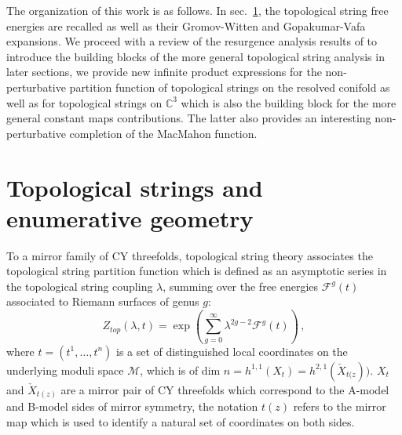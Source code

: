 \documentclass[a4paper,12pt,justification=centering]{article}
\numberwithin{equation}{section}
\theoremstyle{plain}%
\theoremstyle{definition}
\begin{document}
The organization of this work is as follows. In sec.~\ref{sec:freeenergies}, the topological string free energies are recalled as well as their Gromov-Witten and Gopakumar-Vafa expansions. We proceed with a review of the resurgence analysis results of \cite{Alim:2021mhp} to introduce the building blocks of the more general topological string analysis in later sections, we provide new infinite product expressions for the non-perturbative partition function of topological strings on the resolved conifold as well as for topological strings on $\mathbb{C}^3$ which is also the building block for the more general constant maps contributions. The latter also provides an interesting non-perturbative completion of the MacMahon function.





\section{Topological strings and enumerative geometry}\label{sec:freeenergies}
To a mirror family of CY threefolds, topological string theory associates the topological string partition function which is defined as an asymptotic series in the topological string coupling $\lambda$, summing over the free energies $ \mathcal{F}^{g}(t)$ associated to Riemann surfaces of genus $g$:
\begin{equation}
Z_{top} (\lambda,t)= \exp \left(\sum_{g=0}^{\infty} \lambda^{2g-2} \mathcal{F}^{g}(t)\right)\,,
\end{equation}
where $t=(t^1,\dots,t^n)$ is a set of distinguished local coordinates on the underlying moduli space $\mathcal{M}$, which is of dim $n=h^{1,1}(X_t)=h^{2,1}(\check{X}_{t(z}))$. $X_t$ and $\check{X}_{t(z)}$ are a mirror pair of CY threefolds which correspond to the A-model and B-model sides of mirror symmetry, the notation $t(z)$ refers to the mirror map which is used to identify a natural set of coordinates on both sides.

\end{document}
